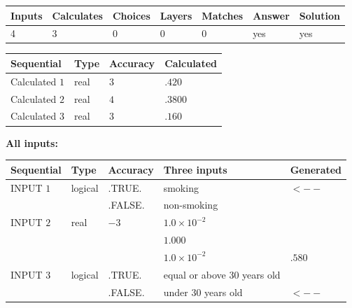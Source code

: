 \documentclass[12pt]{article}
\begin{document}
   
   
   
\noindent\begin{tabular}{|l|l|l|l|l|l|l|}
 \hline
Inputs & Calculates & Choices & Layers & Matches & Answer & Solution \\ \hline
           4 & 
           3 & 
           0
  & 
           0 & 
           0 & 
  yes & 
  yes 
  \\ \hline
 \end{tabular}
   
   
   
   
\noindent{}
   
   
  
  
\noindent\begin{tabular}{|l|l|l|l|}
\hline
 Sequential & Type & Accuracy & Calculated \\ 
\hline
 
 
  Calculated $           1$ & real & $           3 $ & 
 $ .420 $ 
 \\  \hline  
 
 
  Calculated $           2$ & real & $           4 $ & 
 $ .3800 $ 
 \\  \hline  
 
 
  Calculated $           3$ & real & $           3 $ & 
 $ .160 $ 
 \\  \hline  
 \end{tabular}
   
   
   
   
\noindent\vspace{0.1in}\hspace{-0.08in} {\textbf{\Large{All inputs: }}}
   
   
  
  
\noindent\begin{tabular}{|l|l|l|l|l|}
\hline
 Sequential & Type & Accuracy & Three inputs & Generated \\ 
\hline
 
 
  INPUT $           1$ & logical & .TRUE. & 
 smoking & 
  $ <-- $ 
  \\
  & & .FALSE. & 
  non-smoking & 
 \\  \hline  
 
 
  INPUT $           2$ & real & $          -3 $ & $
 1.0 \times 10^{-2}
  $ & \\
  & & &  $
 1.000
  $ & \\
  & & &  $
 1.0 \times 10^{-2}
 $ & $ .580 $ 
 \\  \hline  
 
 
  INPUT $           3$ & logical & .TRUE. & 
 equal or above 30 years old & 
  \\
  & & .FALSE. & 
  under 30 years old & 
  $ <-- $ 
 \\  \hline  
 \end{tabular}
   
\end{document}
